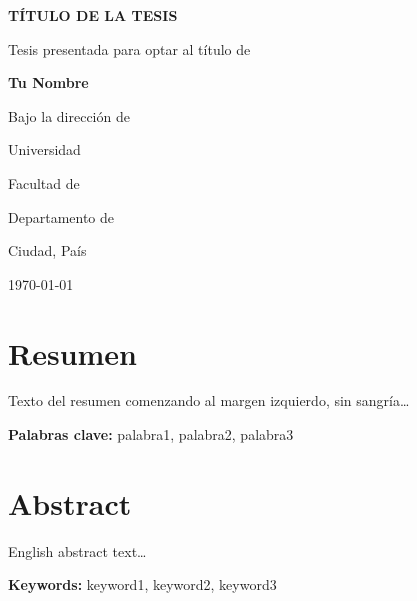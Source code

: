 \documentclass[stu, 12pt, letterpaper,]{apa7}
\begin{document}
\setcounter{page}{1}

\begin{titlepage}
    \centering
    \vspace*{1cm}
    {\LARGE\textbf{TÍTULO DE LA TESIS}\par}
    \vspace{1.5cm}
    {\large Tesis presentada para optar al título de\par}
    \vspace{2cm}
    {\large\textbf{Tu Nombre}\par}
    \vspace{1cm}
    {\large Bajo la dirección de\par}
    \vspace{2cm}
    {\large Universidad\par}
    {\large Facultad de\par}
    {\large Departamento de\par}
    {\large Ciudad, País\par}
    {\large \today\par}
\end{titlepage}

\tableofcontents
\thispagestyle{fancy}
\newpage

\listoffigures
\thispagestyle{fancy}
\listoftables
\thispagestyle{fancy}

\chapter*{Resumen}
\thispagestyle{fancy}
\noindent
Texto del resumen comenzando al margen izquierdo, sin sangría\ldots

\vspace{0.5cm}
\noindent
\textbf{Palabras clave:} palabra1, palabra2, palabra3

\chapter*{Abstract}
\thispagestyle{fancy}
\noindent
English abstract text\ldots

\vspace{0.5cm}
\noindent
\textbf{Keywords:} keyword1, keyword2, keyword3

\mainmatter%
\end{document}

